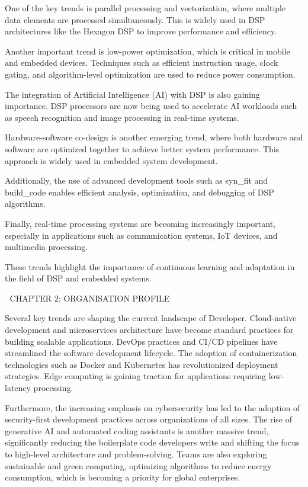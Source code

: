 \documentclass[12pt,a4paper]{report}
\begin{document}
One of the key trends is parallel processing and vectorization, where multiple data elements are processed simultaneously. This is widely used in DSP architectures like the Hexagon DSP to improve performance and efficiency.


Another important trend is low-power optimization, which is critical in mobile and embedded devices. Techniques such as efficient instruction usage, clock gating, and algorithm-level optimization are used to reduce power consumption.


The integration of Artificial Intelligence (AI) with DSP is also gaining importance. DSP processors are now being used to accelerate AI workloads such as speech recognition and image processing in real-time systems.


Hardware-software co-design is another emerging trend, where both hardware and software are optimized together to achieve better system performance. This approach is widely used in embedded system development.


Additionally, the use of advanced development tools such as syn\_fit and build\_code enables efficient analysis, optimization, and debugging of DSP algorithms.


Finally, real-time processing systems are becoming increasingly important, especially in applications such as communication systems, IoT devices, and multimedia processing.


These trends highlight the importance of continuous learning and adaptation in the field of DSP and embedded systems.


🔷 CHAPTER 2: ORGANISATION PROFILE


Several key trends are shaping the current landscape of Developer. Cloud-native development and microservices architecture have become standard practices for building scalable applications. DevOps practices and CI/CD pipelines have streamlined the software development lifecycle. The adoption of containerization technologies such as Docker and Kubernetes has revolutionized deployment strategies. Edge computing is gaining traction for applications requiring low-latency processing.


Furthermore, the increasing emphasis on cybersecurity has led to the adoption of security-first development practices across organizations of all sizes. The rise of generative AI and automated coding assistants is another massive trend, significantly reducing the boilerplate code developers write and shifting the focus to high-level architecture and problem-solving. Teams are also exploring sustainable and green computing, optimizing algorithms to reduce energy consumption, which is becoming a priority for global enterprises.
\end{document}
